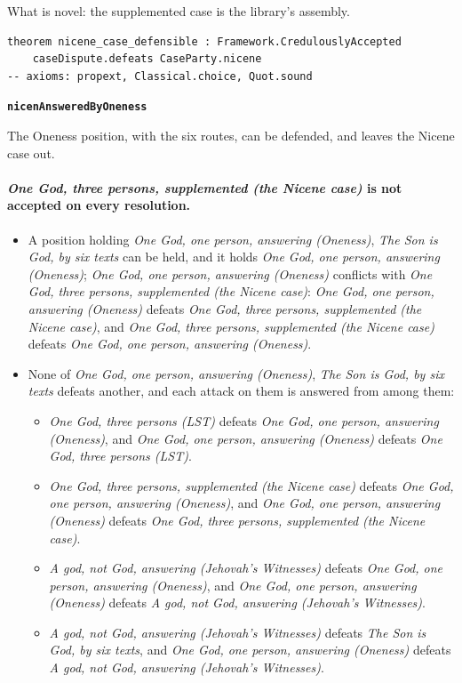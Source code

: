 \documentclass[11pt,paper=\testimonypaper,DIV=13,parskip=false]{scrartcl}
\begin{document}
What is novel: the supplemented case is the library’s assembly.

{\small\begin{verbatim}
theorem nicene_case_defensible : Framework.CredulouslyAccepted
    caseDispute.defeats CaseParty.nicene
-- axioms: propext, Classical.choice, Quot.sound
\end{verbatim}}
\par\medskip\noindent\textbf{\texttt{nicen\allowbreak{}Answered\allowbreak{}By\allowbreak{}Oneness}}\par\nobreak\noindent
The Oneness position, with the six routes, can be defended, and leaves the Nicene case out.

\paragraph{\emph{One God, three persons, supplemented (the Nicene case)} is not accepted on every resolution.}
\begin{itemize}
\item A position holding \emph{One God, one person, answering (Oneness)}, \emph{The Son is God, by six texts} can be held, and it holds \emph{One God, one person, answering (Oneness)}; \emph{One God, one person, answering (Oneness)} conflicts with \emph{One God, three persons, supplemented (the Nicene case)}: \emph{One God, one person, answering (Oneness)} defeats \emph{One God, three persons, supplemented (the Nicene case)}, and \emph{One God, three persons, supplemented (the Nicene case)} defeats \emph{One God, one person, answering (Oneness)}.
\item None of \emph{One God, one person, answering (Oneness)}, \emph{The Son is God, by six texts} defeats another, and each attack on them is answered from among them:
\begin{itemize}
\item \emph{One God, three persons (LST)} defeats \emph{One God, one person, answering (Oneness)}, and \emph{One God, one person, answering (Oneness)} defeats \emph{One God, three persons (LST)}.
\item \emph{One God, three persons, supplemented (the Nicene case)} defeats \emph{One God, one person, answering (Oneness)}, and \emph{One God, one person, answering (Oneness)} defeats \emph{One God, three persons, supplemented (the Nicene case)}.
\item \emph{A god, not God, answering (Jehovah’s Witnesses)} defeats \emph{One God, one person, answering (Oneness)}, and \emph{One God, one person, answering (Oneness)} defeats \emph{A god, not God, answering (Jehovah’s Witnesses)}.
\item \emph{A god, not God, answering (Jehovah’s Witnesses)} defeats \emph{The Son is God, by six texts}, and \emph{One God, one person, answering (Oneness)} defeats \emph{A god, not God, answering (Jehovah’s Witnesses)}.
\end{itemize}
\end{itemize}
\end{document}
